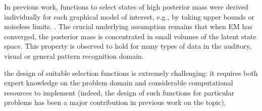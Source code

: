 In previous work, functions to select states of high posterior mass were 
derived individually for each graphical model of interest, e.g., by taking upper bounds or noiseless limits. 
\citep{LuckeEggert2010,SheltonEtAl2012,BornscheinEtAl2013,HennigesEtAl2014,SheikhEtAl2014}.
The crucial underlying assumption remains that when EM has converged,
the posterior mass is concentrated in small volumes of the latent state space.
This property is observed to hold for many types of data in the auditory, visual or general pattern recognition domain.

 the design of suitable selection functions is extremely challenging: it requires both expert knowledge
on the problem domain and considerable computational resources to implement
 (indeed, the design of such functions for  particular problems
has been a major contribution in previous work on the topic).

